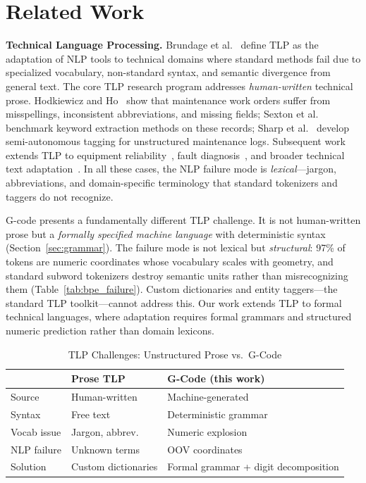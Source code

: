 \documentclass[11pt]{article}
\begin{document}
\section{Related Work}
\label{sec:related}

\textbf{Technical Language Processing.}
Brundage et al.~\cite{tlp_foundational} define TLP as the adaptation of NLP tools to technical domains where standard methods fail due to specialized vocabulary, non-standard syntax, and semantic divergence from general text. The core TLP research program addresses \emph{human-written} technical prose. Hodkiewicz and Ho~\cite{tlp_cleaning} show that maintenance work orders suffer from misspellings, inconsistent abbreviations, and missing fields; Sexton et al.~\cite{tlp_keyword} benchmark keyword extraction methods on these records; Sharp et al.~\cite{tlp_semiautonomous} develop semi-autonomous tagging for unstructured maintenance logs. Subsequent work extends TLP to equipment reliability~\cite{tlp_nuclear}, fault diagnosis~\cite{tlp_fault}, and broader technical text adaptation~\cite{tlp_adapting}. In all these cases, the NLP failure mode is \emph{lexical}---jargon, abbreviations, and domain-specific terminology that standard tokenizers and taggers do not recognize.

G-code presents a fundamentally different TLP challenge. It is not human-written prose but a \emph{formally specified machine language} with deterministic syntax (Section~\ref{sec:grammar}). The failure mode is not lexical but \emph{structural}: 97\% of tokens are numeric coordinates whose vocabulary scales with geometry, and standard subword tokenizers destroy semantic units rather than misrecognizing them (Table~\ref{tab:bpe_failure}). Custom dictionaries and entity taggers---the standard TLP toolkit---cannot address this. Our work extends TLP to formal technical languages, where adaptation requires formal grammars and structured numeric prediction rather than domain lexicons.

\begin{table}[htbp]
\centering
\caption{TLP Challenges: Unstructured Prose vs.\ G-Code}
\label{tab:tlp_comparison}
\scriptsize
\begin{tabular}{@{}lp{2cm}p{2.2cm}@{}}
\toprule
& \textbf{Prose TLP} & \textbf{G-Code (this work)} \\
\midrule
Source      & Human-written       & Machine-generated \\
Syntax      & Free text           & Deterministic grammar \\
Vocab issue & Jargon, abbrev.     & Numeric explosion \\
NLP failure & Unknown terms       & OOV coordinates \\
Solution    & Custom dictionaries & Formal grammar + digit decomposition \\
\bottomrule
\end{tabular}
\normalsize
\end{table}
\end{document}
